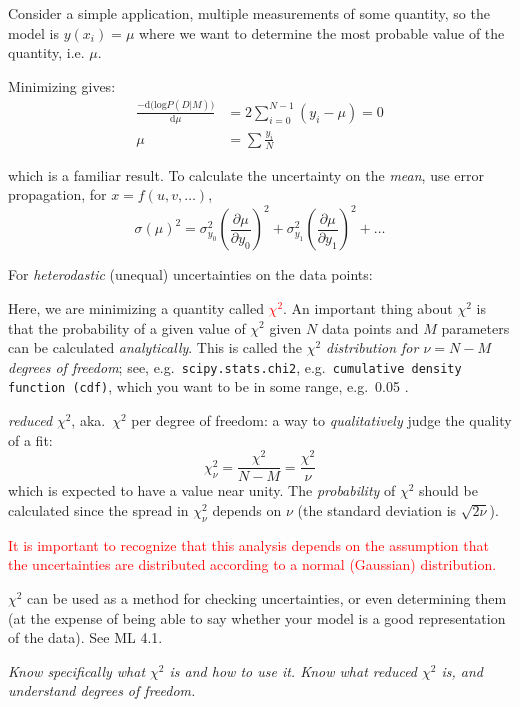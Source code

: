 \documentclass[12pt]{article}
\begin{document}
Consider a simple application, multiple measurements of some quantity, so the
model is $y(x_i) = \mu$ where we want to determine the most probable value of
the quantity, i.e. $\mu$.

Minimizing gives:
\begin{align*}
    \frac{\mathrm{-d(log}P(D|M))}{\mathrm{d}\mu} &= 2\sum^{N-1}_{i=0}
    (y_i - \mu) = 0 \\
    \mu &= \sum \frac{y_i}{N}
\end{align*}

which is a familiar result. To calculate the uncertainty on the
\emph{mean}, use error propagation, for $x=f(u,v,\ldots)$,
    $$ \sigma(\mu)^2 = \sigma_{y_0}^2
    \left( \frac{\partial{\mu}}{\partial{y}_0}\right)^2
    + \sigma_{y_1}^2
    \left( \frac{\partial{\mu}}{\partial{y}_1}\right)^2
    + \ldots $$
    $$ $$
    $$ $$
\par For \emph{heterodastic} (unequal) uncertainties on the data points:
    $$  $$
\par Here, we are minimizing a quantity called \textcolor{red}
{$\chi^2$}. An important thing about $\chi^2$ is that the probability
of a given value of $\chi^2$ given $N$ data points and $M$ parameters
can be calculated \emph{analytically}. This is called the
\emph{$\chi^2$ distribution for $\nu = N-M$ degrees of freedom};
see, e.g.\ \texttt{scipy.stats.chi2}, e.g.\ \texttt{cumulative
density function (cdf)}, which you want to be in some range, e.g.\
0.05 .

\emph{reduced} $\chi^2$, aka.\ $\chi^2$ per degree of freedom:
a way to \emph{qualitatively} judge the quality of a fit:
    $$  \chi_{\nu}^2 = \frac{\chi^2}{N-M} = \frac{\chi^2}{\nu}    $$
which is expected to have a value near unity.
The \emph{probability} of $\chi^2$ should be calculated since the
spread in $\chi_{\nu}^2$ depends on $\nu$ (the standard deviation
is $\sqrt{2\nu}$).

\textcolor{red}{It is important to recognize that this analysis depends
on the assumption that the uncertainties are distributed according to
a normal (Gaussian) distribution.}

$\chi^2$ can be used as a method for checking uncertainties, or even
determining them (at the expense of being able to say whether your
model is a good representation of the data). See ML 4.1.

\colorbox{hl}{\parbox{0.9\textwidth}
{\emph{Know specifically what $\chi^2$ is and how to use it.
Know what reduced $\chi^2$ is, and understand degrees
of freedom.
}}}
\end{document}
